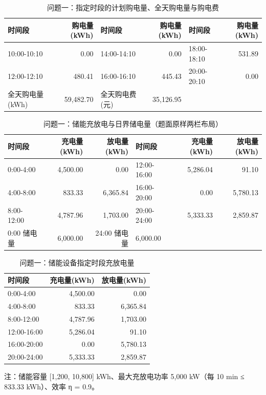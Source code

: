 
\begin{table}[htbp]
\centering
\caption{问题一：指定时段的计划购电量、全天购电量与购电费}
\label{tab:q1-a}
\small
\setlength{\tabcolsep}{4pt}
\begin{tabular}{lrlrlr}
\toprule
时间段 & 购电量(kWh) & 时间段 & 购电量(kWh) & 时间段 & 购电量(kWh) \\
\midrule
10:00-10:10 & 0.00 & 14:00-14:10 & 0.00 & 18:00-18:10 & 531.89 \\
12:00-12:10 & 480.41 & 16:00-16:10 & 445.43 & 20:00-20:10 & 0.00 \\
全天购电量 (kWh) & 59,482.70 & 全天购电费 (元) & 35,126.95 &  &  \\
\bottomrule
\end{tabular}
\end{table}
\begin{table}[htbp]
\centering
\caption{问题一：储能充放电与日界储电量（题面原样两栏布局）}
\label{tab:q1-b2}
\small
\setlength{\tabcolsep}{4pt}
\begin{tabular}{lrrlrr}
\toprule
时间段 & 充电量(kWh) & 放电量(kWh) & 时间段 & 充电量(kWh) & 放电量(kWh) \\
\midrule
0:00-4:00 & 4,500.00 & 0.00 & 12:00-16:00 & 5,286.04 & 91.10 \\
4:00-8:00 & 833.33 & 6,365.84 & 16:00-20:00 & 0.00 & 5,780.13 \\
8:00-12:00 & 4,787.96 & 1,703.00 & 20:00-24:00 & 5,333.33 & 2,859.87 \\
0:00 储电量 & 6,000.00 & 24:00 储电量 & 6,000.00 &  &  \\
\bottomrule
\end{tabular}
\end{table}
\begin{table}[htbp]
\centering
\caption{问题一：储能设备指定时段充放电量}
\label{tab:q1-b}
\small
\setlength{\tabcolsep}{4pt}
\begin{tabular}{lrr}
\toprule
时间段 & 充电量(kWh) & 放电量(kWh) \\
\midrule
0:00-4:00 & 4,500.00 & 0.00 \\
4:00-8:00 & 833.33 & 6,365.84 \\
8:00-12:00 & 4,787.96 & 1,703.00 \\
12:00-16:00 & 5,286.04 & 91.10 \\
16:00-20:00 & 0.00 & 5,780.13 \\
20:00-24:00 & 5,333.33 & 2,859.87 \\
\bottomrule
\end{tabular}
\vspace{2pt}
\begin{flushleft}\footnotesize 注：储能容量 [1,200, 10,800] kWh、最大充放电功率 5,000 kW（每 10 min ≤ 833.33 kWh）、效率 η = 0.9。\end{flushleft}
\end{table}
